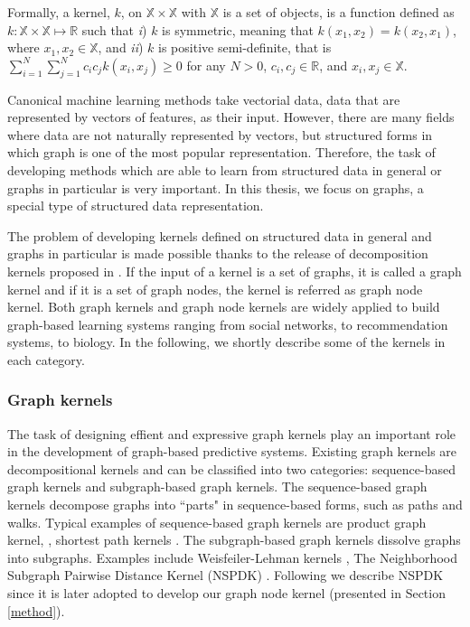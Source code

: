 \documentclass[review]{elsarticle}
\begin{document}
Formally, a kernel, $k$, on $\mathbb{X} \times \mathbb{X}$ with $\mathbb{X}$ is a set of objects, is a function defined as $k: \mathbb{X} \times \mathbb{X}\longmapsto \mathbb{R}$ such that \textit{i}) $k$ is symmetric, meaning that $k(x_1,x_2) = k(x_2,x_1)$, where $x_1, x_2 \in \mathbb{X}$, and \textit{ii}) $k$ is positive semi-definite, that is $\sum_{i=1}^{N}\sum_{j=1}^{N} c_i c_jk(x_i,x_j) \geq 0$ for any $N>0$, $c_i, c_j \in \mathbb{R}$, and  $x_i, x_j \in \mathbb{X}$. 

Canonical machine learning methods take vectorial data, data that are represented by vectors of features, as their input. However, there are many fields where data are not naturally represented by vectors, but structured forms in which graph is one of the most popular representation. Therefore, the task of developing methods which are able to learn from structured data in general or graphs in particular is very important. In this thesis, we focus on graphs, a special type of structured data representation.

The problem of developing kernels defined on structured data in general and graphs in particular is made possible thanks to the release of decomposition kernels proposed in \cite{haussler1999convolution}. If the input of a kernel is a set of graphs, it is called a graph kernel and if it is a set of graph nodes, the kernel is referred as graph node kernel. Both graph kernels and graph node kernels are widely applied to build graph-based learning systems ranging from social networks, to recommendation systems, to biology. In the following, we shortly describe some of the kernels in each category.

\subsubsection{Graph kernels}
\label{graph-kernels}
The task of designing effient and expressive graph kernels play an important role in the development of graph-based predictive systems. Existing graph kernels are decompositional kernels and can be classified into two categories: sequence-based graph kernels and subgraph-based graph kernels. The sequence-based graph kernels decompose graphs into ``parts" in sequence-based forms, such as paths and walks. Typical examples of sequence-based graph kernels are product graph kernel, \cite{gartner2003survey}, shortest path kernels \cite{borgwardt2005shortest}. The subgraph-based graph kernels dissolve graphs into subgraphs. Examples include Weisfeiler-Lehman kernels \cite{shervashidze2009fast, shervashidze2011weisfeiler}, The Neighborhood Subgraph Pairwise Distance Kernel (NSPDK) \cite{costa2010fast}. Following we describe NSPDK since it is later adopted to develop our graph node kernel (presented in Section \ref{method}).
\end{document}
